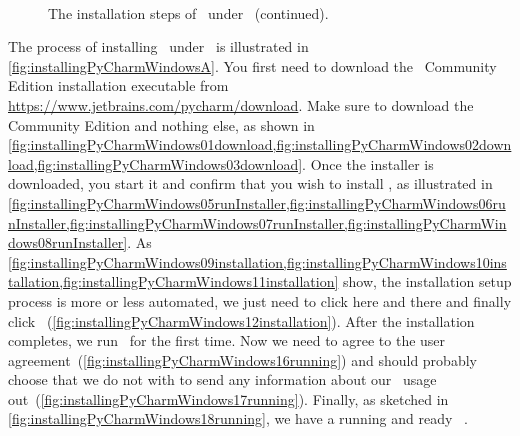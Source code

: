 %
\begin{figure}%
\ContinuedFloat%
\centering%
%
\strut\hfill\strut%
%
%
\strut\hfill\strut\strut\hfill\strut%
%
%
\strut\hfill\strut%
%
\\[10pt]%
%
\strut\hfill\strut%
%
%
\strut\hfill\strut\strut\hfill\strut%
%
%
\strut\hfill\strut%
%
\caption[]{The installation steps of \pycharm\ under \windows~(continued).}%
\label{fig:installingPyCharmWindowsC}%
\end{figure}%
%
The process of installing \pycharm\ under \windows\ is illustrated in \cref{fig:installingPyCharmWindowsA}.
You first need to download the \pycharm\ Community Edition installation executable from \url{https://www.jetbrains.com/pycharm/download}.
Make sure to download the Community Edition and nothing else, as shown in \cref{fig:installingPyCharmWindows01download,fig:installingPyCharmWindows02download,fig:installingPyCharmWindows03download}.
Once the installer is downloaded, you start it and confirm that you wish to install \pycharm, as illustrated in \cref{fig:installingPyCharmWindows05runInstaller,fig:installingPyCharmWindows06runInstaller,fig:installingPyCharmWindows07runInstaller,fig:installingPyCharmWindows08runInstaller}.
As \cref{fig:installingPyCharmWindows09installation,fig:installingPyCharmWindows10installation,fig:installingPyCharmWindows11installation} show, the installation setup process is more or less automated, we just need to click  here and there and finally click ~(\cref{fig:installingPyCharmWindows12installation}).
After the installation completes, we run \pycharm\ for the first time.
Now we need to agree to the user agreement~(\cref{fig:installingPyCharmWindows16running}) and should probably choose that we do not with to send any information about our \pycharm\ usage out~(\cref{fig:installingPyCharmWindows17running}).
Finally, as sketched in \cref{fig:installingPyCharmWindows18running}, we have a running and ready \pycharm\ .%
%
\FloatBarrier%
\endhsection%
%
